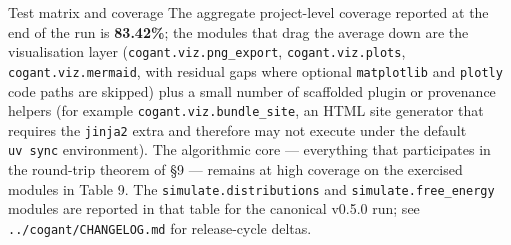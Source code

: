 \documentclass[
  ignorenonframetext,
]{beamer}
\begin{document}
\begin{frame}[fragile]{Test matrix and coverage}
The aggregate project-level coverage reported at the end of the run is
\textbf{83.42\%}; the modules that drag the average down are the
visualisation layer (\texttt{cogant.viz.png\_export},
\texttt{cogant.viz.plots}, \texttt{cogant.viz.mermaid}, with residual
gaps where optional \texttt{matplotlib} and \texttt{plotly} code paths
are skipped) plus a small number of scaffolded plugin or provenance
helpers (for example \texttt{cogant.viz.bundle\_site}, an HTML site
generator that requires the \texttt{jinja2} extra and therefore may not
execute under the default \texttt{uv\ sync} environment). The
algorithmic core --- everything that participates in the round-trip
theorem of §9 --- remains at high coverage on the exercised modules in
Table 9. The \texttt{simulate.distributions} and
\texttt{simulate.free\_energy} modules are reported in that table for
the canonical v0.5.0 run; see \texttt{../cogant/CHANGELOG.md} for
release-cycle deltas.
\end{frame}
\end{document}
